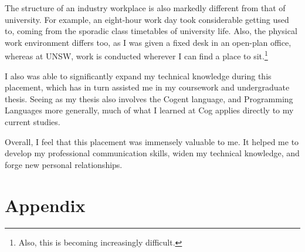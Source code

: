 \documentclass{report}
\begin{document}
The structure of an industry workplace is also markedly different from that of university. For example,
an eight-hour work day took considerable getting used to, coming from the sporadic class timetables 
of university life. Also, the physical work environment differs too, as I was given a fixed desk in 
an open-plan office, whereas at UNSW, work is conducted wherever I can find a place to sit.\footnote{Also, this is becoming increasingly difficult.}

I also was able to significantly expand my technical knowledge during this placement, which has in
turn assisted me in my coursework and undergraduate thesis. Seeing as my thesis also involves the 
Cogent language, and Programming Languages more generally, much of what I learned at Cog applies 
directly to my current studies.

Overall, I feel that this placement was immensely valuable to me. It helped me to develop my 
professional communication skills, widen my technical knowledge, and forge new personal relationships.



\chapter{Appendix}
\end{document}
